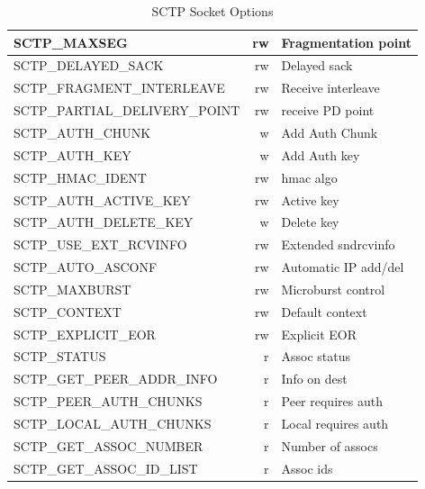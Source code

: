 \documentclass[conference]{IEEEtran}
\begin{document}
\begin{table}[h]
\begin{center}
\begin{tabular}{|l|r|l|}
SCTP\_MAXSEG                    & rw  & Fragmentation point      \\\hline
SCTP\_DELAYED\_SACK             & rw  & Delayed sack             \\\hline
SCTP\_FRAGMENT\_INTERLEAVE      & rw  & Receive interleave       \\\hline
SCTP\_PARTIAL\_DELIVERY\_POINT  & rw  & receive PD point         \\\hline
SCTP\_AUTH\_CHUNK               & w   & Add Auth Chunk           \\\hline
SCTP\_AUTH\_KEY                 & w   & Add Auth key             \\\hline
SCTP\_HMAC\_IDENT               & rw  & hmac algo                \\\hline
SCTP\_AUTH\_ACTIVE\_KEY         & rw  & Active key               \\\hline
SCTP\_AUTH\_DELETE\_KEY         & w   & Delete key               \\\hline
SCTP\_USE\_EXT\_RCVINFO         & rw  & Extended sndrcvinfo      \\\hline
SCTP\_AUTO\_ASCONF              & rw  & Automatic IP add/del     \\\hline
SCTP\_MAXBURST                  & rw  & Microburst control       \\\hline
SCTP\_CONTEXT                   & rw  & Default context          \\\hline
SCTP\_EXPLICIT\_EOR             & rw  & Explicit EOR             \\\hline
SCTP\_STATUS                    & r   & Assoc status             \\\hline
SCTP\_GET\_PEER\_ADDR\_INFO     & r   & Info on dest             \\\hline
SCTP\_PEER\_AUTH\_CHUNKS        & r   & Peer requires auth       \\\hline
SCTP\_LOCAL\_AUTH\_CHUNKS       & r   & Local requires auth      \\\hline
SCTP\_GET\_ASSOC\_NUMBER        & r   & Number of assocs         \\\hline
SCTP\_GET\_ASSOC\_ID\_LIST      & r   & Assoc ids                \\\hline
\end{tabular}
\end{center}
\caption{SCTP Socket Options\label{sockopt}}
\end{table}
\end{document}
